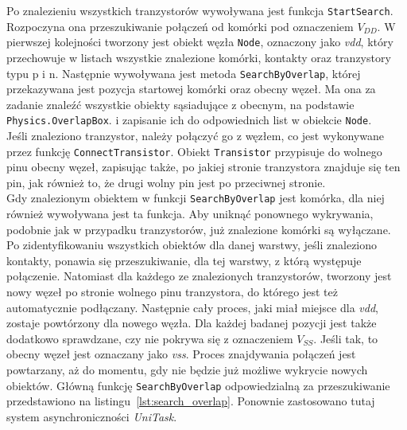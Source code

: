 

Po znalezieniu wszystkich tranzystorów wywoływana jest funkcja \texttt{StartSearch}.
Rozpoczyna ona przeszukiwanie połączeń od komórki pod oznaczeniem $V_{DD}$.\linebreak
W pierwszej kolejności tworzony jest obiekt węzła \texttt{Node}, oznaczony jako \textit{vdd},
który przechowuje w listach wszystkie znalezione komórki,
kontakty oraz tranzystory typu p i n.
Następnie wywoływana jest metoda \texttt{SearchByOverlap},
której przekazywana jest pozycja startowej komórki oraz obecny węzeł.
Ma ona za zadanie znaleźć wszystkie obiekty sąsiadujące z obecnym,
na podstawie \texttt{Physics.OverlapBox}.
i zapisanie ich do odpowiednich list w obiekcie \texttt{Node}.\\
\indent Jeśli znaleziono tranzystor, należy połączyć go z węzłem,
co jest wykonywane przez funkcję \texttt{ConnectTransistor}.
Obiekt \texttt{Transistor} przypisuje do wolnego pinu obecny węzeł,
zapisując także, po jakiej stronie tranzystora znajduje się ten pin,
jak również to, że drugi wolny pin jest po przeciwnej stronie.\\
\indent Gdy znalezionym obiektem w funkcji \texttt{SearchByOverlap} jest komórka,
dla niej również wywoływana jest ta funkcja. %
Aby uniknąć ponownego wykrywania, podobnie jak w przypadku tranzystorów,
już znalezione komórki są wyłączane.\\
\indent Po zidentyfikowaniu wszystkich obiektów dla danej warstwy,
jeśli znaleziono kontakty, ponawia się przeszukiwanie, dla tej warstwy, z którą występuje połączenie.
Natomiast dla każdego ze znalezionych tranzystorów,
tworzony jest nowy węzeł po stronie wolnego pinu tranzystora,
do którego jest też automatycznie podłączany.
Następnie cały proces, jaki miał miejsce dla \textit{vdd}, zostaje powtórzony dla nowego węzła.
Dla każdej badanej pozycji jest także dodatkowo sprawdzane, czy nie pokrywa się z oznaczeniem $V_{SS}$.
Jeśli tak, to obecny węzeł jest oznaczany jako \textit{vss}.
Proces znajdywania połączeń jest powtarzany, aż do momentu,
gdy nie będzie już możliwe wykrycie nowych obiektów.
Główną funkcję \texttt{SearchByOverlap} odpowiedzialną za przeszukiwanie przedstawiono na listingu~\ref{lst:search_overlap}.
Ponownie zastosowano tutaj system asynchroniczności \textit{UniTask}.



